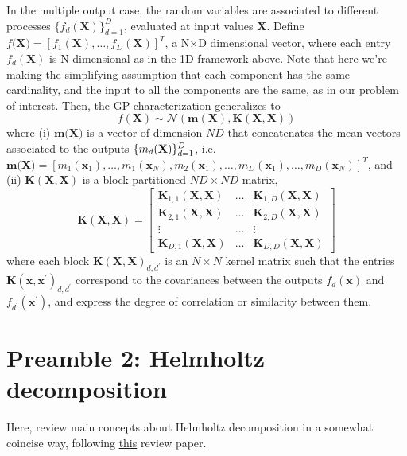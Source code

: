 \documentclass[11pt,a4paper]{article}
\begin{document}
In the multiple output case, the random variables are associated to different processes $\{f_d(\textbf{X})\}_{d=1}^D$, evaluated at input values $\textbf{X}$. Define $f(\textbf{X)} = [f_1(\textbf{X}), \ldots, f_D(\textbf{X})]^T$, a N$\times$D dimensional vector, where each entry $f_d(\textbf{X})$ is N-dimensional as in the 1D framework above. Note that here we're making the simplifying assumption that each component has the same cardinality, and the input to all the components are the same, as in our problem of interest. Then, the GP characterization generalizes to 
$$
f(\textbf{X}) \sim \mathcal{N}(\textbf{m}(\textbf{X}), \textbf{K}(\textbf{X}, \textbf{X}))
$$
where (i) $\textbf{m}(\textbf{X)}$ is a vector of dimension $ND$ that concatenates the mean vectors associated to the outputs $\allowdisplaybreaks \{m_d(\textbf{X})\}_{d=1}^D$, i.e. $\textbf{m}(\textbf{X)} = [m_1(\textbf{x}_1), \ldots, m_1(\textbf{x}_N), m_2(\textbf{x}_1), \ldots, m_D(\textbf{x}_1), \ldots, m_D(\textbf{x}_N)]^T$, and (ii) $\textbf{K}(\textbf{X}, \textbf{X})$ is a block-partitioned $ND \times ND$ matrix,
$$
\textbf{K}(\textbf{X}, \textbf{X}) = 
\begin{bmatrix}
\textbf{K}_{1,1}(\textbf{X}, \textbf{X}) & \ldots & \textbf{K}_{1,D}(\textbf{X}, \textbf{X}) \\  \textbf{K}_{2,1}(\textbf{X}, \textbf{X}) & \ldots & \textbf{K}_{2,D}(\textbf{X}, \textbf{X}) \\
\vdots & \ldots & \vdots \\
\textbf{K}_{D,1}(\textbf{X}, \textbf{X}) & \ldots & \textbf{K}_{D,D}(\textbf{X}, \textbf{X})
\end{bmatrix}
 $$
 where each block $\textbf{K}(\textbf{X}, \textbf{X})_{d,d^\prime}$ is an $N \times N$ kernel  matrix such that the entries $\textbf{K}(\textbf{x}, \textbf{x}^\prime)_{d,d^\prime}$ correspond to the covariances between the outputs $f_d(\textbf{x})$ and $f_{d^\prime}(\textbf{x}^\prime)$, and express the degree of correlation or similarity between them. \\
 

\section*{Preamble 2: Helmholtz decomposition}

Here, review main concepts about Helmholtz decomposition in a somewhat coincise way, following  \href{https://ieeexplore.ieee.org/stamp/stamp.jsp?tp=\&arnumber=6365629}{this} review paper. 
\end{document}
